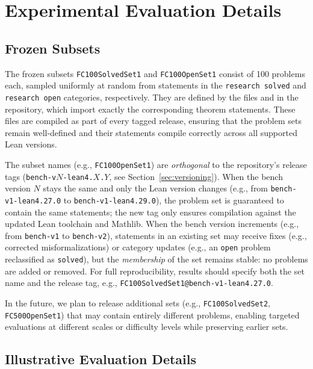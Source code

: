 \section{Experimental Evaluation Details}\label{sec:app_experimental_evaluation}


\subsection{Frozen Subsets}\label{sec:app_bench_lists}

The frozen subsets \texttt{FC100SolvedSet1} and \texttt{FC100OpenSet1} consist of 100 problems each, sampled uniformly at random from statements in the \texttt{research solved} and \texttt{research open} categories, respectively.
They are defined by the files  and  in the repository, which import exactly the corresponding theorem statements.
These files are compiled as part of every tagged release, ensuring that the problem sets remain well-defined and their statements compile correctly across all supported Lean versions.

The subset names (e.g., \texttt{FC100OpenSet1}) are \emph{orthogonal} to the repository's release tags (\texttt{bench-v$N$-lean4.$X$.$Y$}, see Section~\ref{sec:versioning}).
When the bench version $N$ stays the same and only the Lean version changes (e.g., from \texttt{bench-v1-lean4.27.0} to \texttt{bench-v1-lean4.29.0}), the problem set is guaranteed to contain the same statements; the new tag only ensures compilation against the updated Lean toolchain and Mathlib.
When the bench version increments (e.g., from \texttt{bench-v1} to \texttt{bench-v2}), statements in an existing set may receive fixes (e.g., corrected misformalizations) or category updates (e.g., an \texttt{open} problem reclassified as \texttt{solved}), but the \emph{membership} of the set remains stable: no problems are added or removed.
For full reproducibility, results should specify both the set name and the release tag, e.g., \texttt{FC100SolvedSet1@bench-v1-lean4.27.0}.

In the future, we plan to release additional sets (e.g., \texttt{FC100SolvedSet2}, \texttt{FC500OpenSet1}) that may contain entirely different problems, enabling targeted evaluations at different scales or difficulty levels while preserving earlier sets.


\subsection{Illustrative Evaluation Details}\label{sec:illustrative_evaluation}


